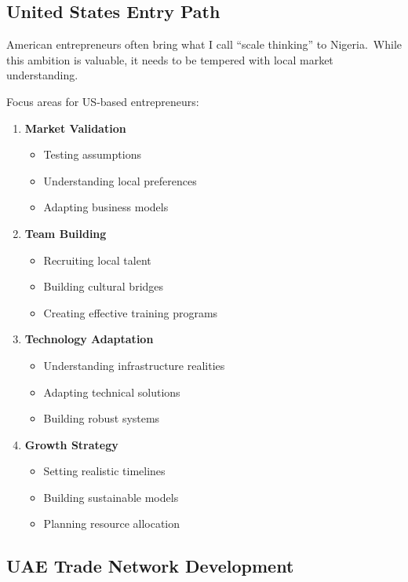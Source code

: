 \subsection{United States Entry Path}\label{subsec:united-states-entry-path}

American entrepreneurs often bring what I call ``scale thinking'' to Nigeria.\ While this ambition is valuable, it needs to be tempered with local market understanding.

Focus areas for US-based entrepreneurs:

\begin{enumerate}
    \item \textbf{Market Validation}
    \begin{itemize}
        \item Testing assumptions
        \item Understanding local preferences
        \item Adapting business models
    \end{itemize}

    \item \textbf{Team Building}
    \begin{itemize}
        \item Recruiting local talent
        \item Building cultural bridges
        \item Creating effective training programs
    \end{itemize}

    \item \textbf{Technology Adaptation}
    \begin{itemize}
        \item Understanding infrastructure realities
        \item Adapting technical solutions
        \item Building robust systems
    \end{itemize}

    \item \textbf{Growth Strategy}
    \begin{itemize}
        \item Setting realistic timelines
        \item Building sustainable models
        \item Planning resource allocation
    \end{itemize}
\end{enumerate}
\subsection{UAE Trade Network Development}\label{subsec:uae-trade-development-1}

